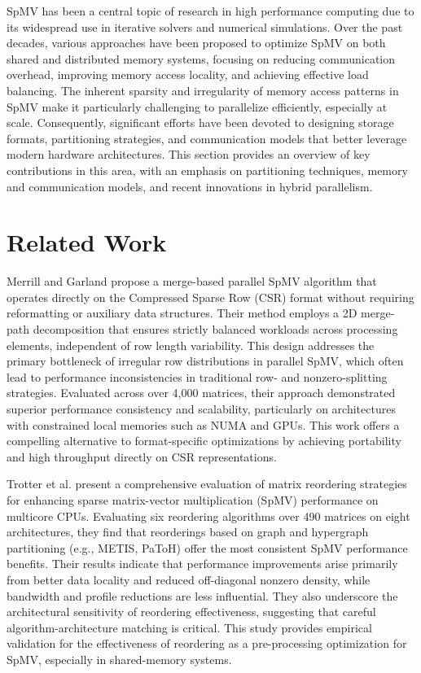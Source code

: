 SpMV has been a central topic of research in high performance computing due to its widespread use in iterative solvers and numerical simulations. Over the past decades, various approaches have been proposed to optimize SpMV on both shared and distributed memory systems, focusing on reducing communication overhead, improving memory access locality, and achieving effective load balancing. The inherent sparsity and irregularity of memory access patterns in SpMV make it particularly challenging to parallelize efficiently, especially at scale. Consequently, significant efforts have been devoted to designing storage formats, partitioning strategies, and communication models that better leverage modern hardware architectures. This section provides an overview of key contributions in this area, with an emphasis on partitioning techniques, memory and communication models, and recent innovations in hybrid parallelism.

\chapter{Related Work}
Merrill and Garland \cite{merrilduane} propose a merge-based parallel SpMV algorithm that operates directly on the Compressed Sparse Row (CSR) format without requiring reformatting or auxiliary data structures. Their method employs a 2D merge-path decomposition that ensures strictly balanced workloads across processing elements, independent of row length variability. This design addresses the primary bottleneck of irregular row distributions in parallel SpMV, which often lead to performance inconsistencies in traditional row- and nonzero-splitting strategies. Evaluated across over 4,000 matrices, their approach demonstrated superior performance consistency and scalability, particularly on architectures with constrained local memories such as NUMA and GPUs. This work offers a compelling alternative to format-specific optimizations by achieving portability and high throughput directly on CSR representations.
\medskip

Trotter et al. \cite{ordersparse} present a comprehensive evaluation of matrix reordering strategies for enhancing sparse matrix-vector multiplication (SpMV) performance on multicore CPUs. Evaluating six reordering algorithms over 490 matrices on eight architectures, they find that reorderings based on graph and hypergraph partitioning (e.g., METIS, PaToH) offer the most consistent SpMV performance benefits. Their results indicate that performance improvements arise primarily from better data locality and reduced off-diagonal nonzero density, while bandwidth and profile reductions are less influential. They also underscore the architectural sensitivity of reordering effectiveness, suggesting that careful algorithm-architecture matching is critical. This study provides empirical validation for the effectiveness of reordering as a pre-processing optimization for SpMV, especially in shared-memory systems.

